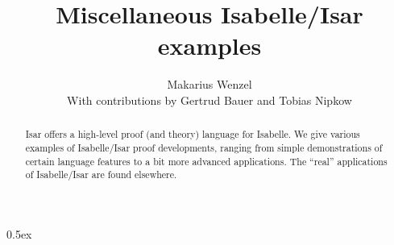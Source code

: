 \documentclass[11pt,a4paper]{article}
\begin{document}
\title{Miscellaneous Isabelle/Isar examples}
\author{Makarius Wenzel \\[2ex]
  With contributions by Gertrud Bauer and Tobias Nipkow}
\maketitle

\begin{abstract}
  Isar offers a high-level proof (and theory) language for Isabelle.
  We give various examples of Isabelle/Isar proof developments,
  ranging from simple demonstrations of certain language features to a
  bit more advanced applications.  The ``real'' applications of
  Isabelle/Isar are found elsewhere.
\end{abstract}

\tableofcontents

\parindent 0pt \parskip 0.5ex



\nocite{isabelle-isar-ref,Wenzel:1999:TPHOL}


\end{document}
